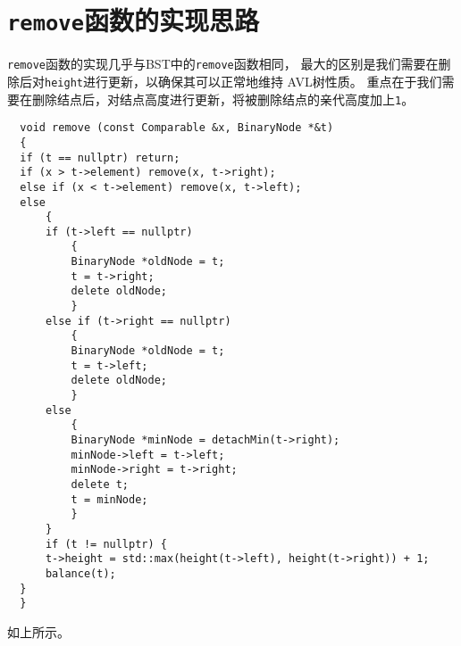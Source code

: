 \documentclass[UTF8]{ctexart}
\begin{document}
\pagestyle{fancy}
\fancyhead{}
\rhead{\today}

\section{\texttt{remove}函数的实现思路}
\texttt{remove}函数的实现几乎与BST中的\texttt{remove}函数相同，
最大的区别是我们需要在删除后对\texttt{height}进行更新，以确保其可以正常地维持
AVL树性质。
重点在于我们需要在删除结点后，对结点高度进行更新，将被删除结点的亲代高度加上\texttt{1}。
\begin{lstlisting}
  void remove (const Comparable &x, BinaryNode *&t) 
  {
  if (t == nullptr) return;
  if (x > t->element) remove(x, t->right);
  else if (x < t->element) remove(x, t->left);
  else
      {
      if (t->left == nullptr) 
          {
          BinaryNode *oldNode = t;
          t = t->right;
          delete oldNode;
          }
      else if (t->right == nullptr) 
          {
          BinaryNode *oldNode = t;
          t = t->left;
          delete oldNode;
          }
      else
          {
          BinaryNode *minNode = detachMin(t->right);
          minNode->left = t->left;
          minNode->right = t->right;
          delete t;
          t = minNode;
          }
      }
      if (t != nullptr) {
      t->height = std::max(height(t->left), height(t->right)) + 1;
      balance(t);
  }
  }
\end{lstlisting}
如上所示。
\end{document}
